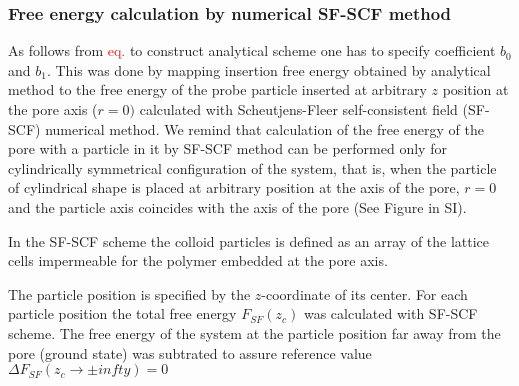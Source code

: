 \documentclass[12pt, a4paper]{article}
\newcommand\todo[1]{\textcolor{red}{#1}}
\begin{document}
\subsubsection{Free energy calculation by numerical SF-SCF method}
As follows from \todo{eq.} to construct analytical scheme one has to specify coefficient $b_0$ and $b_1$.
This was done by mapping insertion free energy obtained by analytical method 
to the free energy of the probe particle inserted at arbitrary $z$ position at the pore axis ($r=0)$ 
calculated with Scheutjens-Fleer self-consistent field (SF-SCF) numerical method.
We remind that calculation of the free energy of the pore with a particle in it by SF-SCF method  can be performed only 
for cylindrically symmetrical configuration of the system, that is, when the particle of cylindrical shape is placed at arbitrary position at the axis of the pore, $r=0$ and
the particle axis coincides with the axis of the pore (See Figure in SI).
  

In the SF-SCF scheme the colloid particles is defined as an array of the lattice cells impermeable for the polymer embedded at the pore axis.

The particle position is specified by the $z$-coordinate of its center. 
For each particle position the total free energy $F_{SF}(z_c)$ was calculated with SF-SCF scheme. 
The free energy of the system at the particle position far away from the pore (ground state) was subtrated to 
assure reference value $\Delta F_{SF}(z_c \rightarrow \pm infty) = 0$

\end{document}
